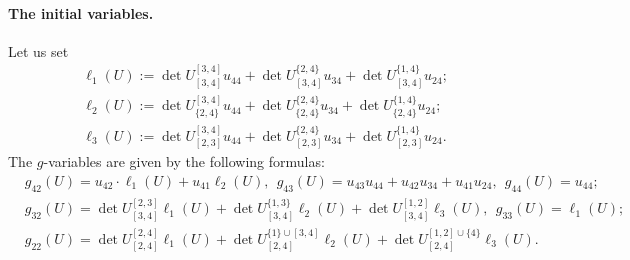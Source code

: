 \paragraph{The initial variables.} Let us set
\begin{align}
    &\ell_1(U) := \det U^{[3,4]}_{[3,4]}u_{44} +\det U^{\{2,4\}}_{[3,4]} u_{34}+ \det U_{[3,4]}^{\{1,4\}} u_{24};\\
    &\ell_2(U) := \det U^{[3,4]}_{\{2,4\}}u_{44} +\det U^{\{2,4\}}_{\{2,4\}} u_{34}+ \det U_{\{2,4\}}^{\{1,4\}} u_{24};\\
    &\ell_3(U) := \det U^{[3,4]}_{[2,3]}u_{44} +\det U^{\{2,4\}}_{[2,3]} u_{34}+ \det U_{[2,3]}^{\{1,4\}} u_{24}.
\end{align}
The $g$-variables are given by the following formulas:
\begin{align}
    &g_{42}(U) = u_{42}\cdot \ell_1(U) + u_{41}\ell_2(U), \ \ g_{43}(U) = u_{43}u_{44} + u_{42}u_{34} + u_{41}u_{24}, \ \ g_{44}(U) = u_{44}; \\
    &g_{32}(U) = \det U_{[3,4]}^{[2,3]}\ell_1(U) + \det U_{[3,4]}^{\{1,3\}}\ell_2(U) + \det U_{[3,4]}^{[1,2]}\ell_3(U), \ \ g_{33}(U) = \ell_1(U);\\
    &g_{22}(U) = \det U_{[2,4]}^{[2,4]}\ell_1(U) + \det U^{\{1\}\cup[3,4]}_{[2,4]}\ell_2(U) + \det U_{[2,4]}^{[1,2]\cup\{4\}}\ell_3(U).
\end{align}

